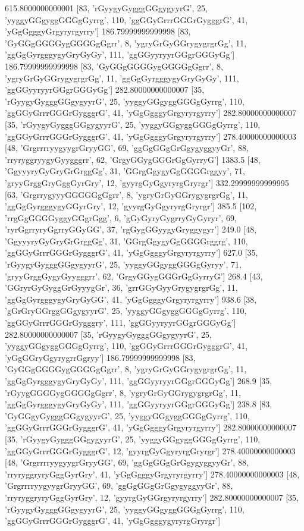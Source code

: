 615.8000000000001 [83, 'rGyygyGygggGGgygyyrG', 25, 'yyggyGGgyggGGGgGyrrg', 110, 'ggGGyGrrrGGGrGygggrG', 41, 'yGgGgggyGrgyryrgyrry']
186.79999999999998 [83, 'GyGGgGGGGygGGGGgGgrr', 8, 'ygryGrGyGGrygygrgrGg', 11, 'ggGgGyrgggygyGryGyGy', 111, 'ggGGyyryyrGGgrGGGyGg']
186.79999999999998 [83, 'GyGGgGGGGygGGGGgGgrr', 8, 'ygryGrGyGGrygygrgrGg', 11, 'ggGgGyrgggygyGryGyGy', 111, 'ggGGyyryyrGGgrGGGyGg']
282.80000000000007 [35, 'rGyygyGygggGGgygyyrG', 25, 'yyggyGGgyggGGGgGyrrg', 110, 'ggGGyGrrrGGGrGygggrG', 41, 'yGgGgggyGrgyryrgyrry']
282.80000000000007 [35, 'rGyygyGygggGGgygyyrG', 25, 'yyggyGGgyggGGGgGyrrg', 110, 'ggGGyGrrrGGGrGygggrG', 41, 'yGgGgggyGrgyryrgyrry']
278.40000000000003 [48, 'GrgrrrryygyygrGryyGG', 69, 'ggGgGGgGrGgygyggyyGr', 88, 'rryryggryygyGyygggrr', 62, 'GrgyGGygGGGrGgGyrryG']
1383.5 [48, 'GgyyyryGyGryGrGrggGg', 31, 'GGrgGgygyGgGGGGrggyy', 71, 'gryyGrggGryGggGyrGry', 12, 'gyyrgGyGgyryrgGryrgr']
332.29999999999995 [63, 'GrgrrygyyyGGGGGgGgrr', 8, 'ygryGrGyGGrygygrgrGg', 11, 'ggGgGyrgggygyGGyrGry', 12, 'gyyrgGyGgyryrgGryrgr']
385.5 [102, 'rrgGgGGGGyggyGGgrGgg', 6, 'gGyGyryGygrryGyGyryr', 69, 'ryrGgrryryGgrryGGyGG', 37, 'rgGygGGyygyGryggygyr']
249.0 [48, 'GgyyyryGyGryGrGrggGg', 31, 'GGrgGgygyGgGGGGrggrg', 110, 'ggGGyGrrrGGGrGygggrG', 41, 'yGgGgggyGrgyryrgyrry']
627.0 [35, 'rGyygyGygggGGgygyyrG', 25, 'yyggyGGgyggGGGgGyryy', 71, 'gryyGrggGygyGyygggrr', 62, 'GrgyGGygGGGrGgGyrryG']
268.4 [43, 'GGryrGyGyggGrGyyygGr', 36, 'grrGGyGyyGrygygrgrGg', 11, 'ggGgGyrgggygyGryGyGG', 41, 'yGgGgggyGrgyryrgyrry']
938.6 [38, 'gGrGryGGrggGGgygyyrG', 25, 'yyggyGGgyggGGGgGyrrg', 110, 'ggGGyGrrrGGGrGygggry', 111, 'ggGGyyryyrGGgrGGGyGg']
282.80000000000007 [35, 'rGyygyGygggGGgygyyrG', 25, 'yyggyGGgyggGGGgGyrrg', 110, 'ggGGyGrrrGGGrGygggrG', 41, 'yGgGGryGgyrygrrGgryy']
186.79999999999998 [83, 'GyGGgGGGGygGGGGgGgrr', 8, 'ygryGrGyGGrygygrgrGg', 11, 'ggGgGyrgggygyGryGyGy', 111, 'ggGGyyryyrGGgrGGGyGg']
268.9 [35, 'rGyygGGGGygGGGGgGgrr', 8, 'ygryGrGyGGrygygrgrGg', 11, 'ggGgGyrgggygyGryGyGy', 111, 'ggGGyyryyrGGgrGGGyGg']
238.8 [83, 'GyGGgyGygggGGgygyyrG', 25, 'yyggyGGgyggGGGgGyrrg', 110, 'ggGGyGrrrGGGrGygggrG', 41, 'yGgGgggyGrgyryrgyrry']
282.80000000000007 [35, 'rGyygyGygggGGgygyyrG', 25, 'yyggyGGgyggGGGgGyrrg', 110, 'ggGGyGrrrGGGrGygggrG', 12, 'gyyrgGyGgyryrgGryrgr']
278.40000000000003 [48, 'GrgrrrryygyygrGryyGG', 69, 'ggGgGGgGrGgygyggyyGr', 88, 'rryryggryryGggGyrGry', 41, 'yGgGgggyGrgyryrgyrry']
278.40000000000003 [48, 'GrgrrrryygyygrGryyGG', 69, 'ggGgGGgGrGgygyggyyGr', 88, 'rryryggryryGggGyrGry', 12, 'gyyrgGyGGrgyryrgyrry']
282.80000000000007 [35, 'rGyygyGygggGGgygyyrG', 25, 'yyggyGGgyggGGGgGyrrg', 110, 'ggGGyGrrrGGGrGygggrG', 41, 'yGgGgggygyryrgGryrgr']

